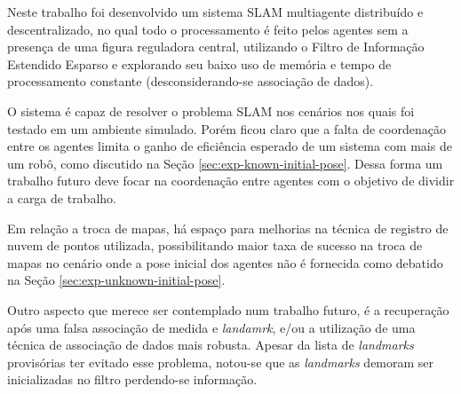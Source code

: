Neste trabalho foi desenvolvido um sistema SLAM multiagente distribuído e 
descentralizado, no qual todo o processamento é feito pelos agentes sem a presença de uma figura reguladora central, utilizando o Filtro de Informação Estendido Esparso e explorando seu baixo uso de memória e tempo de processamento constante (desconsiderando-se associação de dados).

O sistema é capaz de resolver o problema SLAM nos cenários nos quais foi 
testado em um ambiente simulado. Porém ficou claro que a falta de 
coordenação entre os agentes limita o ganho de eficiência esperado de 
um sistema com mais de um robô, como discutido na Seção \ref{sec:exp-known-initial-pose}. Dessa forma um trabalho futuro deve focar na coordenação entre agentes com o objetivo de dividir a carga de trabalho.

Em relação a troca de mapas, há espaço para melhorias na técnica de registro de nuvem de pontos utilizada, possibilitando maior taxa de sucesso na troca de mapas 
no cenário onde a pose inicial dos agentes não é fornecida como debatido na Seção \ref{sec:exp-unknown-initial-pose}.

Outro aspecto que merece ser contemplado num trabalho futuro, é a recuperação após uma falsa associação de medida e \textit{landamrk}, e/ou a 
utilização de uma técnica de associação de dados mais robusta. Apesar da 
lista de \textit{landmarks} provisórias ter evitado esse problema, notou-se que as \textit{landmarks} demoram ser inicializadas no filtro perdendo-se informação.